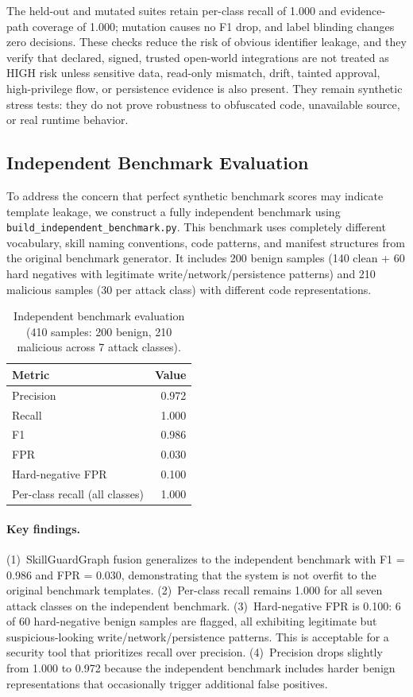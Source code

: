 \documentclass[10pt]{article}
\begin{document}
The held-out and mutated suites retain per-class recall of 1.000 and evidence-path coverage of 1.000; mutation causes no F1 drop, and label blinding changes zero decisions. These checks reduce the risk of obvious identifier leakage, and they verify that declared, signed, trusted open-world integrations are not treated as HIGH risk unless sensitive data, read-only mismatch, drift, tainted approval, high-privilege flow, or persistence evidence is also present. They remain synthetic stress tests: they do not prove robustness to obfuscated code, unavailable source, or real runtime behavior.

\subsection{Independent Benchmark Evaluation}
\label{sec:independent}

To address the concern that perfect synthetic benchmark scores may indicate template leakage, we construct a fully independent benchmark using \texttt{build\_independent\_benchmark.py}. This benchmark uses completely different vocabulary, skill naming conventions, code patterns, and manifest structures from the original benchmark generator. It includes 200 benign samples (140 clean + 60 hard negatives with legitimate write/network/persistence patterns) and 210 malicious samples (30 per attack class) with different code representations.

\begin{table}[t]
\centering
\caption{Independent benchmark evaluation (410 samples: 200 benign, 210 malicious across 7 attack classes).}
\label{tab:independent}
\begin{tabular}{lr}
\toprule
Metric & Value \\
\midrule
Precision & 0.972 \\
Recall & 1.000 \\
F1 & 0.986 \\
FPR & 0.030 \\
Hard-negative FPR & 0.100 \\
Per-class recall (all classes) & 1.000 \\
\bottomrule
\end{tabular}
\end{table}

\paragraph{Key findings.}
(1)~SkillGuardGraph fusion generalizes to the independent benchmark with F1 = 0.986 and FPR = 0.030, demonstrating that the system is not overfit to the original benchmark templates.
(2)~Per-class recall remains 1.000 for all seven attack classes on the independent benchmark.
(3)~Hard-negative FPR is 0.100: 6 of 60 hard-negative benign samples are flagged, all exhibiting legitimate but suspicious-looking write/network/persistence patterns. This is acceptable for a security tool that prioritizes recall over precision.
(4)~Precision drops slightly from 1.000 to 0.972 because the independent benchmark includes harder benign representations that occasionally trigger additional false positives.
\end{document}

